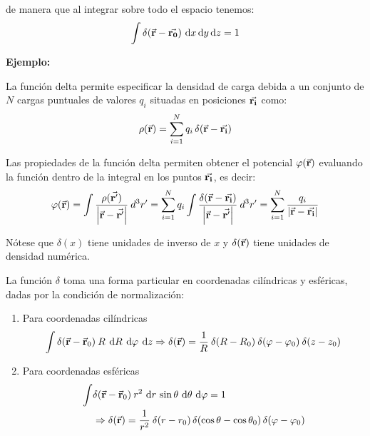 de manera que al integrar sobre todo el espacio tenemos:
\begin{align*}
\int \delta (\va{\bm{r}} - \va{\bm{r_{0}}}) \, \dd{x} \dd{y}  \dd{z} = 1
\end{align*}

\textbf{Ejemplo:}

La función delta permite especificar la densidad de carga debida a un conjunto de $N$ cargas puntuales de valores $q_{i}$ situadas en posiciones $\va{r_{i}}$  como:
\begin{align}
\rho (\va{r}) = \sum_{i=1}^{N} q_{i} \, \delta(\va{r} - \va{r_{i}})
\label{eq:ecuacion_A_04}
\end{align}

Las propiedades de la función delta permiten obtener el potencial $\varphi(\va{r})$ evaluando la función dentro de la integral en los puntos $\va{r_{i}}$, es decir:
\begin{align}
\varphi(\va{r}) = \int \dfrac{\rho(\va{\ensuremath{{r}^{\prime}}})}{\abs{\va{r} - \va{\ensuremath{{r}^{\prime}}}}} \: d^{3}{r}^{\prime} = \sum_{i=1}^{N} q_{i} \int \dfrac{\delta ( \va{r} - \va{r_{i}})}{\abs{\va{r} - \va{\ensuremath{{r}^{\prime}}}}} \: d^{3}{r}^{\prime} = \sum_{i=1}^{N} \dfrac{q_{i}}{\abs{\va{r} - \va{r_{i}}}}
\label{eq:ecuacion_A_05}
\end{align}

Nótese que $\delta (x)$ tiene unidades de inverso de $x$ y $\delta (\va{r})$ tiene unidades de densidad numérica.
\par
La función $\delta$ toma una forma particular en coordenadas cilíndricas y esféricas, dadas por la condición de normalización:
\begin{enumerate}
\item Para coordenadas cilíndricas
\begin{equation}
\int \delta (\va{r} - \va{r}_{0}) \: R \: \dd{R} \: \dd{\varphi} \: \dd{z} \Rightarrow \delta (\va{r}) =  \dfrac{1}{R} \: \delta (R - R_{0}) \: \delta (\varphi - \varphi_{0}) \: \delta (z - z_{0})
\end{equation}
\item  Para coordenadas esféricas
\begin{equation}
\begin{aligned}
\int & \delta (\va{r} - \va{r}_{0}) \: r^{2} \, \dd{r} \, \sin \theta \, \dd{\theta} \, \dd{\varphi} = 1 \\
&\Rightarrow \delta (\va{r}) = \dfrac{1}{r^{2}} \: \delta (r - r_{0}) \, \delta (\cos \theta - \cos \theta_{0}) \, \delta (\varphi - \varphi_{0})
\end{aligned}
\end{equation}
\end{enumerate}

